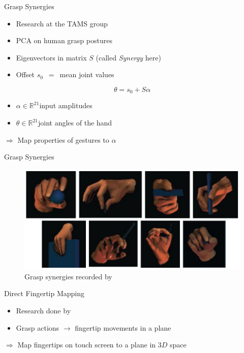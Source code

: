 \documentclass[t]{beamer}
\begin{document}
\begin{frame}{Grasp Synergies}
\begin{itemize}
	\item Research at the TAMS group \cite{Bernardino2013}
	\item PCA on human grasp postures
	\item Eigenvectors in matrix $S$ (called \textit{Synergy} here)
	\item Offset $s_0$~$=$~mean joint values 
\end{itemize}

\begin{equation}
\theta = s_0 + S\alpha
\end{equation}

\begin{itemize}
	\item $\alpha \in \mathbb{R}^{21}$\quad input amplitudes
	\item $\theta \in \mathbb{R}^{21}$\quad joint angles of the hand
\end{itemize}

$\Rightarrow$ Map properties of gestures to $\alpha$

\end{frame}

\begin{frame}{Grasp Synergies}
\begin{figure}
	\includegraphics[height=0.6\textheight]{assets/pres/grasps.PNG}
	\caption{Grasp synergies recorded by \citeauthor{Bernardino2013}\cite{Bernardino2013}}
\end{figure}
\end{frame}

\begin{frame}{Direct Fingertip Mapping}
\begin{itemize}
	\item Research done by \citeauthor{conf:humanoids:TohHLBZP12} \cite{conf:humanoids:TohHLBZP12}
	\item Grasp actions $\rightarrow$ fingertip movements in a plane
\end{itemize}

$\Rightarrow$ Map fingertips on touch screen to a plane in $3D$ space
\end{frame}
\end{document}
